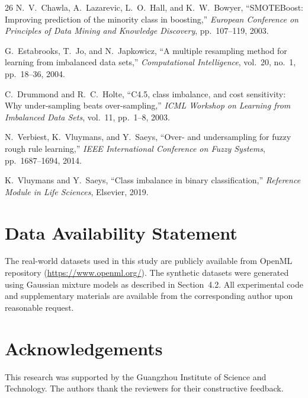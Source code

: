 \documentclass{ijSmartGrid}
\theoremstyle{definition}
\begin{document}
\begin{thebibliography}{26}
N.~V.~Chawla, A.~Lazarevic, L.~O.~Hall, and K.~W.~Bowyer,
``SMOTEBoost: Improving prediction of the minority class in boosting,''
\emph{European Conference on Principles of Data Mining and Knowledge Discovery}, pp.~107--119, 2003.

G.~Estabrooks, T.~Jo, and N.~Japkowicz,
``A multiple resampling method for learning from imbalanced data sets,''
\emph{Computational Intelligence}, vol.~20, no.~1, pp.~18--36, 2004.

C.~Drummond and R.~C.~Holte,
``C4.5, class imbalance, and cost sensitivity: Why under-sampling beats over-sampling,''
\emph{ICML Workshop on Learning from Imbalanced Data Sets}, vol.~11, pp.~1--8, 2003.

N.~Verbiest, K.~Vluymans, and Y.~Saeys,
``Over- and undersampling for fuzzy rough rule learning,''
\emph{IEEE International Conference on Fuzzy Systems}, pp.~1687--1694, 2014.

K.~Vluymans and Y.~Saeys,
``Class imbalance in binary classification,''
\emph{Reference Module in Life Sciences}, Elsevier, 2019.

\end{thebibliography}

\section*{Data Availability Statement}
The real-world datasets used in this study are publicly available from OpenML repository (\url{https://www.openml.org/}). The synthetic datasets were generated using Gaussian mixture models as described in Section~4.2. All experimental code and supplementary materials are available from the corresponding author upon reasonable request.

\section*{Acknowledgements}
This research was supported by the Guangzhou Institute of Science and Technology. The authors thank the reviewers for their constructive feedback.
\end{document}
